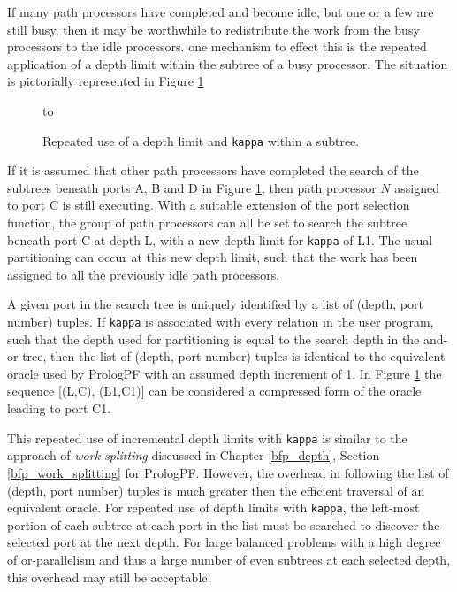 If many path processors have completed and become idle, but one or a few are still
busy, then it may be worthwhile to redistribute the work from the busy processors to
the idle processors.  one mechanism to effect this is the repeated application of a
depth limit within the subtree of a busy processor.  The situation is pictorially
represented in Figure \ref{repeat_kappa}

\begin{figure}[htbp]
\vspace{5mm} \hbox to 
\caption{Repeated use of a depth limit and \texttt{kappa} within a subtree.}
\vspace{5mm}
\label{repeat_kappa}
\end{figure}

If it is assumed that other path processors have completed the search of the 
subtrees beneath ports A, B and D in Figure \ref{repeat_kappa}, then path
processor $N$ assigned to port C is still executing.  With a suitable extension
of the port selection function, the group of path processors can all be
set to search the subtree beneath port C at depth L,
with a new depth limit for \texttt{kappa} of L1.  The usual partitioning can occur at
this new depth limit, such that the work has been assigned to all the previously
idle path processors.

A given port in the search tree is uniquely identified by a list of (depth, port number)
tuples.  If \texttt{kappa} is associated with every relation in the user program, such that
the depth used for partitioning is equal to the search depth in the and-or tree, then
the list of (depth, port number) tuples is identical to the equivalent oracle used by
PrologPF with an assumed depth increment of 1.  In Figure \ref{repeat_kappa} the
sequence [(L,C), (L1,C1)] can be considered a compressed form of the oracle leading to
port C1.

This repeated use of incremental depth limits with \texttt{kappa} is similar to
the approach of \textit{work splitting} discussed in Chapter \ref{bfp_depth},
Section \ref{bfp_work_splitting} for PrologPF.  However, the overhead in following
the list of (depth, port number) tuples is much greater then the efficient traversal
of an equivalent oracle.  For repeated use of depth limits with \texttt{kappa}, the
left-most portion of each subtree at each port in the list must be searched to
discover the selected port at the next depth.  For large balanced problems with a high
degree of or-parallelism and thus a large number of even subtrees at each selected
depth, this overhead may still be acceptable.


